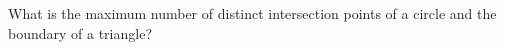 What is the maximum number of distinct intersection points of a circle and the boundary of a triangle?
